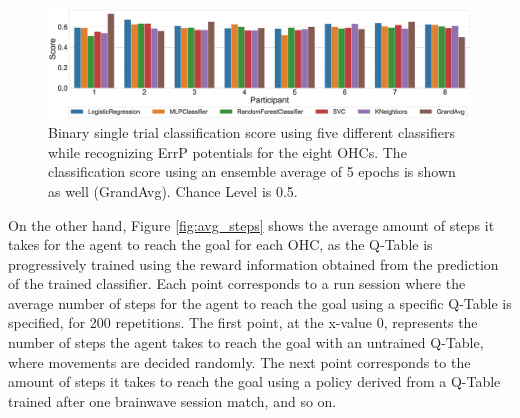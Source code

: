 \documentclass[journal]{IEEEtran}
\begin{document}
{{\begin{figure}[ht]
    \centering
    \includegraphics[scale=0.12]{revisedimages/cross_val.eps}
    \caption{Binary single trial classification score using five different classifiers while recognizing ErrP potentials for the eight OHCs.  The classification score using an ensemble average of 5 epochs is shown as well (GrandAvg). Chance Level is 0.5.}
    \label{fig:classifiers}
\end{figure}

On the other hand, Figure \ref{fig:avg_steps} shows the average amount of steps it takes for the agent to reach the goal for each OHC, as the Q-Table is progressively trained using the reward information obtained from the prediction of the trained classifier. Each point corresponds to a run session where the average number of steps for the agent to reach the goal using a specific Q-Table is specified, for 200 repetitions. The first point, at the x-value 0, represents the number of steps the agent takes to reach the goal with an untrained Q-Table, where movements are decided randomly. The next point corresponds to the amount of steps it takes to reach the goal using a policy derived from a Q-Table trained after one brainwave session match, and so on.

}}
\end{document}

